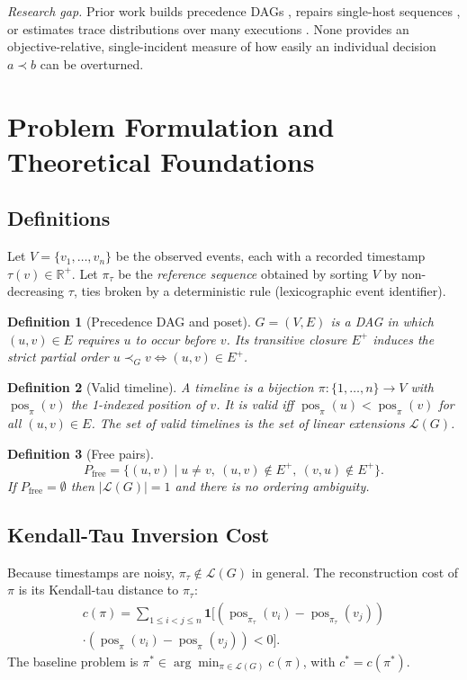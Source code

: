 \documentclass{ieeeaccess}
\newtheorem{definition}{Definition}
\newcommand{\Pfree}{P_{\mathrm{free}}}
\DeclareMathOperator{\pos}{pos}
\newcommand{\ind}{\mathbf{1}}
\newcommand{\Lin}{\mathcal{L}}
\begin{document}
\emph{Research gap.} Prior work builds precedence DAGs \cite{Pegoraro2020a}, repairs single-host sequences \cite{Kimm2026}, or estimates trace distributions over many executions \cite{vanderAa2020}. None provides an objective-relative, single-incident measure of how easily an individual decision $a\prec b$ can be overturned.

\section{Problem Formulation and Theoretical Foundations}\label{sec:problem}

\subsection{Definitions}
Let $V=\{v_1,\dots,v_n\}$ be the observed events, each with a recorded timestamp $\tau(v)\in\mathbb{R}^+$. Let $\pi_\tau$ be the \emph{reference sequence} obtained by sorting $V$ by non-decreasing $\tau$, ties broken by a deterministic rule (lexicographic event identifier).

\begin{definition}[Precedence DAG and poset]
$G=(V,E)$ is a DAG in which $(u,v)\in E$ requires $u$ to occur before $v$. Its transitive closure $E^+$ induces the strict partial order $u\prec_G v \iff (u,v)\in E^+$.
\end{definition}

\begin{definition}[Valid timeline]
A timeline is a bijection $\pi:\{1,\dots,n\}\to V$ with $\pos_\pi(v)$ the 1-indexed position of $v$. It is \emph{valid} iff $\pos_\pi(u)<\pos_\pi(v)$ for all $(u,v)\in E$. The set of valid timelines is the set of linear extensions $\Lin(G)$.
\end{definition}

\begin{definition}[Free pairs]
\begin{equation}
\Pfree=\{(u,v)\mid u\neq v,\ (u,v)\notin E^+,\ (v,u)\notin E^+\}.
\end{equation}
If $\Pfree=\emptyset$ then $|\Lin(G)|=1$ and there is no ordering ambiguity.
\end{definition}

\subsection{Kendall-Tau Inversion Cost}
Because timestamps are noisy, $\pi_\tau\notin\Lin(G)$ in general. The reconstruction cost of $\pi$ is its Kendall-tau distance \cite{Kendall1938} to $\pi_\tau$:
\begin{multline}
c(\pi)=\sum_{1\le i<j\le n}\ind\!\big[(\pos_{\pi_\tau}(v_i)-\pos_{\pi_\tau}(v_j))\\
\cdot(\pos_\pi(v_i)-\pos_\pi(v_j))<0\big].
\end{multline}
The baseline problem is $\pi^*\in\arg\min_{\pi\in\Lin(G)}c(\pi)$, with $c^*=c(\pi^*)$.
\end{document}
